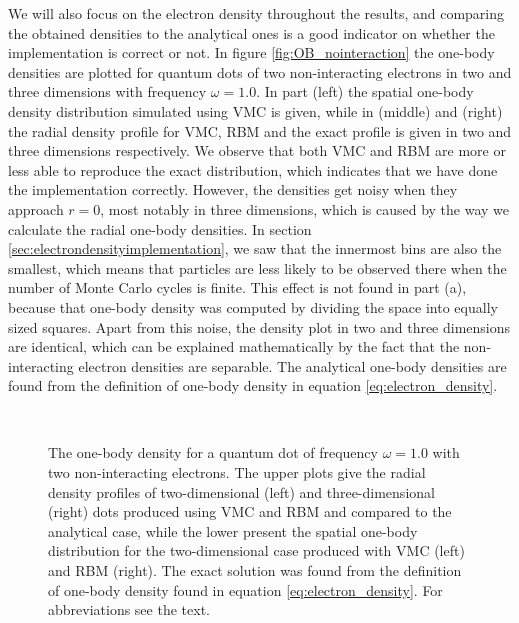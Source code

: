We will also focus on the electron density throughout the results, and comparing the obtained densities to the analytical ones is a good indicator on whether the implementation is correct or not. In figure \eqref{fig:OB_nointeraction} the one-body densities are plotted for quantum dots of two non-interacting electrons in two and three dimensions with frequency $\omega=1.0$. In part (left) the spatial one-body density distribution simulated using VMC is given, while in (middle) and (right) the radial density profile for VMC, RBM and the exact profile is given in two and three dimensions respectively. We observe that both VMC and RBM are more or less able to reproduce the exact distribution, which indicates that we have done the implementation correctly. However, the densities get noisy when they approach $r=0$, most notably in three dimensions, which is caused by the way we calculate the radial one-body densities. In section \ref{sec:electrondensityimplementation}, we saw that the innermost bins are also the smallest, which means that particles are less likely to be observed there when the number of Monte Carlo cycles is finite. This effect is not found in part (a), because that one-body density was computed by dividing the space into equally sized squares. Apart from this noise, the density plot in two and three dimensions are identical, which can be explained mathematically by the fact that the non-interacting electron densities are separable. The analytical one-body densities are found from the definition of one-body density in equation \eqref{eq:electron_density}.

\begin{figure}
	\centering
	\captionsetup[subfigure]{labelformat=empty}
	\\
	
	\caption{The one-body density for a quantum dot of frequency $\omega=1.0$ with two non-interacting electrons. The upper plots give the radial density profiles of two-dimensional (left) and three-dimensional (right) dots produced using VMC and RBM and compared to the analytical case, while the lower present the spatial one-body distribution for the two-dimensional case produced with VMC (left) and RBM (right). The exact solution was found from the definition of one-body density found in equation \eqref{eq:electron_density}. For abbreviations see the text.}
	\label{fig:OB_nointeraction}
\end{figure}

